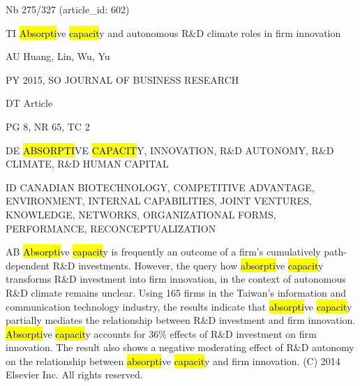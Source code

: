 \documentclass[a4paper]{article}
\begin{document}
\vspace*{-2cm}
Nb \tabto{0cm}275/327 (article\_id: 602)\par
TI \tabto{0cm}\hl{Absorpti}ve \hl{capacit}y and autonomous R\&D climate roles in firm innovation\par
AU \tabto{0cm}Huang, Lin, Wu, Yu\par
PY \tabto{0cm}2015, SO JOURNAL OF BUSINESS RESEARCH\par
DT \tabto{0cm}Article\par
PG \tabto{0cm}8, NR 65, TC 2\par
DE \tabto{0cm}\hl{ABSORPTI}VE \hl{CAPACIT}Y, INNOVATION, R\&D AUTONOMY, R\&D CLIMATE, R\&D HUMAN CAPITAL\par
ID \tabto{0cm}CANADIAN BIOTECHNOLOGY, COMPETITIVE ADVANTAGE, ENVIRONMENT, INTERNAL CAPABILITIES, JOINT VENTURES, KNOWLEDGE, NETWORKS, ORGANIZATIONAL FORMS, PERFORMANCE, RECONCEPTUALIZATION\par
AB \tabto{0cm}\hl{Absorpti}ve \hl{capacit}y is frequently an outcome of a firm's cumulatively path-dependent R\&D investments. However, the query how \hl{absorpti}ve \hl{capacit}y transforms R\&D investment into firm innovation, in the context of autonomous R\&D climate remains unclear. Using 165 firms in the Taiwan's information and communication technology industry, the results indicate that \hl{absorpti}ve \hl{capacit}y partially mediates the relationship between R\&D investment and firm innovation. \hl{Absorpti}ve \hl{capacit}y accounts for 36\% effects of R\&D investment on firm innovation. The result also shows a negative moderating effect of R\&D autonomy on the relationship between \hl{absorpti}ve \hl{capacit}y and firm innovation. (C) 2014 Elsevier Inc. All rights reserved.\par
\clearpage
\end{document}
